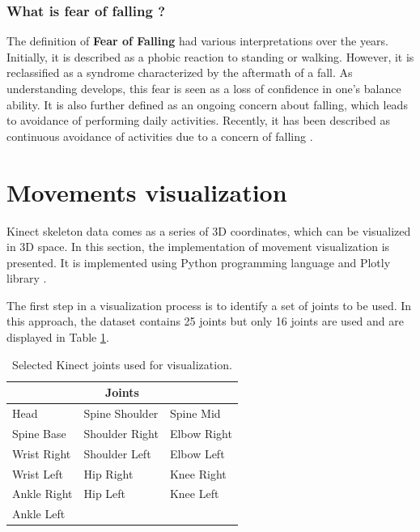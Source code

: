         \subsubsection{What is fear of falling ?}
        
            The definition of \textbf{Fear of Falling} had various interpretations over the years. Initially, it is described as a phobic reaction to standing or walking. However, it is reclassified as a syndrome characterized by the aftermath of a fall. As understanding develops, this fear is seen as a loss of confidence in one's balance ability. It is also further defined as an ongoing concern about falling, which leads to avoidance of performing daily activities. Recently, it has been described as continuous avoidance of activities due to a concern of falling \cite{jung_fear_2008}.
    
    \section{Movements visualization} \label{sec:movements_visualization}
        
        Kinect skeleton data comes as a series of 3D coordinates, which can be visualized in 3D space. In this section, the implementation of movement visualization is presented. It is implemented using Python programming language and Plotly library \cite{plotly}.

        The first step in a visualization process is to identify a set of joints to be used. In this approach, the dataset contains 25 joints but only 16 joints are used and are displayed in Table \ref{tab:joints_select}. 

        \begin{table}[H]
            \centering
            \begin{tabularx}{1.0\textwidth}{XXX}
                \toprule
                \multicolumn{3}{c}{\textbf{Joints}} \\
                \midrule
                Head & Spine Shoulder & Spine Mid \\
                Spine Base & Shoulder Right & Elbow Right \\
                Wrist Right & Shoulder Left & Elbow Left \\
                Wrist Left & Hip Right & Knee Right \\
                Ankle Right & Hip Left & Knee Left \\
                Ankle Left & & \\
                \bottomrule
            \end{tabularx}
            \caption{Selected Kinect joints used for visualization.}
            \label{tab:joints_select}
        \end{table}
        
